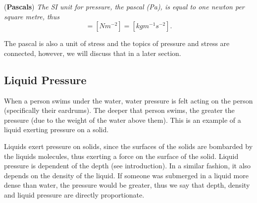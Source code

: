 \begin{definition}{(\textbf{Pascals})}
\textit{The SI unit for pressure, the pascal (Pa), is equal to one newton per square metre, thus}
\begin{equation*}
    [Pa] = [Nm^{-2}] = [kgm^{-1}s^{-2}].
\end{equation*}
\end{definition}

The pascal is also a unit of stress and the topics of pressure and stress are connected, however, we will discuss that in a later section. 

\subsection{Liquid Pressure}

When a person swims under the water, water pressure is felt acting on the person (specifically their eardrums). The deeper that person swims, the greater the pressure (due to the weight of the water above them). This is an example of a liquid exerting pressure on a solid.

Liquids exert pressure on solids, since the surfaces of the solids are bombarded by the liquids molecules, thus exerting a force on the surface of the solid. Liquid pressure is dependent of the depth (see introduction). In a similar fashion, it also depends on the density of the liquid. If someone was submerged in a liquid more dense than water, the pressure would be greater, thus we say that depth, density and liquid pressure are directly proportionate. 


